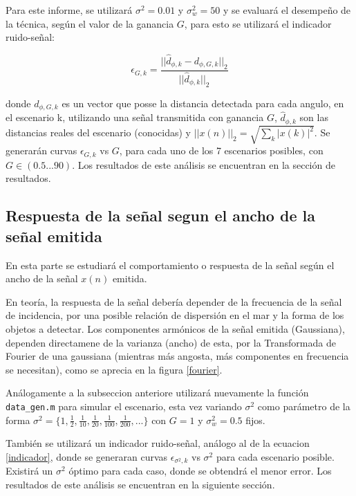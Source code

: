 \documentclass[letterpaper,11pt]{article}
\begin{document}
Para este informe, se utilizará $\sigma^2 = 0.01$ y $\sigma_{w}^2 = 50$ y se evaluará el desempeño de la técnica, según el valor de la ganancia $G$, para esto se utilizará el indicador ruido-señal:

\begin{equation}
\epsilon_{G,k} = \frac{||\hat{d}_{\phi,k} - d_{\phi,G,k}||_{2}}{||\hat{d}_{\phi,k}||_{2}}
\label{indicador}
\end{equation}

donde $d_{\phi,G,k}$ es un vector que posse la distancia detectada para cada angulo, en el escenario k, utilizando una señal transmitida con ganancia $G$, $\hat{d}_{\phi,k}$ son las distancias reales del escenario (conocidas) y $||x(n)||_{2} = \sqrt{\sum_{k} |x(k)|^{2}}$. Se generarán curvas $\epsilon_{G,k}$ vs $G$, para cada uno de los 7 escenarios posibles, con $G \in (0.5...90)$. Los resultados de este análisis se encuentran en la sección de resultados.


\subsection{Respuesta de la señal segun el ancho de la señal emitida}

En esta parte se estudiará el comportamiento o respuesta de la señal según el ancho de la señal $x(n)$ emitida.\par

En teoría, la respuesta de la señal debería depender de la frecuencia de la señal de incidencia, por una posible relación de dispersión en el mar y la forma de los objetos a detectar. Los componentes armónicos de la señal emitida (Gaussiana), dependen directamene de la varianza (ancho) de esta, por la Transformada de Fourier de una gaussiana (mientras más angosta, más componentes en frecuencia se necesitan), como se aprecia en la figura \ref{fourier}.\par

Análogamente a la subseccion anteriore utilizará nuevamente la función \texttt{data\_gen.m} para simular el escenario, esta vez variando $\sigma^2$ como parámetro de la forma $\sigma^2 = \{1,\frac{1}{2},\frac{1}{10},\frac{1}{20},\frac{1}{100},\frac{1}{200},...\}$ con $G = 1$ y $\sigma_{w}^2 = 0.5$ fijos.

También se utilizará un indicador ruido-señal, análogo al de la ecuacion \eqref{indicador}, donde se generaran curvas $\epsilon_{\sigma^2,k}$ vs $\sigma^2$ para cada escenario posible. Existirá un $\sigma^2$ óptimo para cada caso, donde se obtendrá el menor error. Los resultados de este análisis se encuentran en la siguiente sección.
\end{document}
